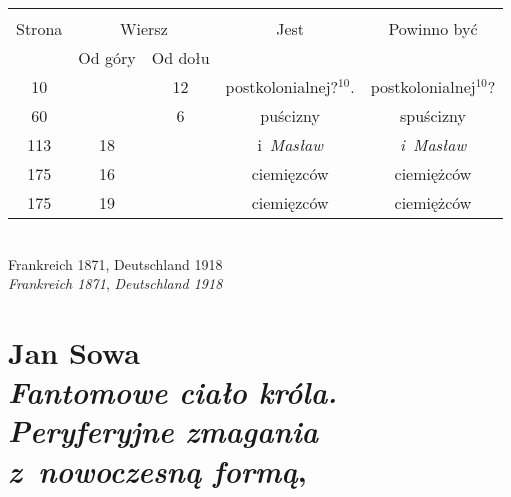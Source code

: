 \documentclass[a4paper,11pt]{article}
\numberwithin{equation}{section}
\begin{document}
\begin{center}

  \begin{tabular}{|c|c|c|c|c|}
    \hline
    & \multicolumn{2}{c|}{} & & \\
    Strona & \multicolumn{2}{c|}{Wiersz} & Jest
                              & Powinno być \\ \cline{2-3}
    & Od góry & Od dołu & & \\
    \hline
    10  & & 12 & postkolonialnej?$^{ 10 }$. & postkolonialnej$^{ 10 }$? \\
    60  & &  6 & puścizny & spuścizny \\
    113 & 18 & & i~\textit{Masław} & \textit{i~Masław} \\
    175 & 16 & & ciemięzców & ciemiężców \\
    175 & 19 & & ciemięzców & ciemiężców \\
    \hline
  \end{tabular}

\end{center}

\VerSpaceTwo


\noindent
{} \\
\Jest Frankreich 1871, Deutschland 1918 \\
\PowinnoByc \textit{Frankreich 1871}, \textit{Deutschland 1918} \\













\section{ %
  Jan Sowa \\
  \textit{Fantomowe ciało króla. Peryferyjne zmagania z~nowoczesną formą},
  \cite{SowaFantomoweCialoKrola2011}}
\end{document}
